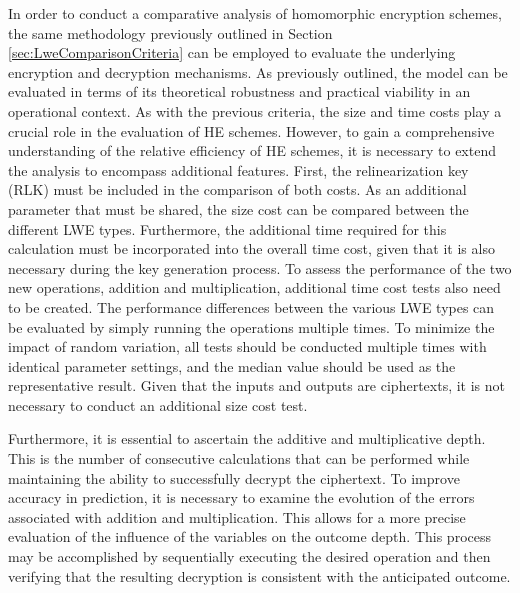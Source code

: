In order to conduct a comparative analysis of homomorphic encryption schemes, the same methodology previously outlined in Section \ref{sec:LweComparisonCriteria} can be employed to evaluate the underlying encryption and decryption mechanisms. As previously outlined, the model can be evaluated in terms of its theoretical robustness and practical viability in an operational context. As with the previous criteria, the size and time costs play a crucial role in the evaluation of HE schemes. However, to gain a comprehensive understanding of the relative efficiency of HE schemes, it is necessary to extend the analysis to encompass additional features. 
First, the relinearization key (RLK) must be included in the comparison of both costs. As an additional parameter that must be shared, the size cost can be compared between the different LWE types. Furthermore, the additional time required for this calculation must be incorporated into the overall time cost, given that it is also necessary during the key generation process. To assess the performance of the two new operations, addition and multiplication, additional time cost tests also need to be created. The performance differences between the various LWE types can be evaluated by simply running the operations multiple times. To minimize the impact of random variation, all tests should be conducted multiple times with identical parameter settings, and the median value should be used as the representative result. Given that the inputs and outputs are ciphertexts, it is not necessary to conduct an additional size cost test. 

Furthermore, it is essential to ascertain the additive and multiplicative depth. This is the number of consecutive calculations that can be performed while maintaining the ability to successfully decrypt the ciphertext. To improve accuracy in prediction, it is necessary to examine the evolution of the errors associated with addition and multiplication. This allows for a more precise evaluation of the influence of the variables on the outcome depth. This process may be accomplished by sequentially executing the desired operation and then verifying that the resulting decryption is consistent with the anticipated outcome.
